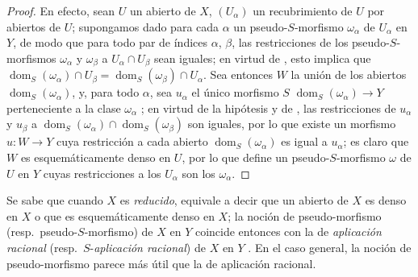 \begin{proof}
En efecto, sean $U$ un abierto de $X$, $(U_\alpha)$ un recubrimiento de $U$ por abiertos de $U$; supongamos dado para cada $\alpha$ un pseudo-$S$-morfismo $\omega_\alpha$ de $U_\alpha$ en $Y$, de modo que para todo par de índices $\alpha$, $\beta$, las restricciones  de los pseudo-$S$-morfismos $\omega_\alpha$ y $\omega_\beta$ a $U_\alpha\cap U_\beta$ sean iguales; en virtud de , esto implica que $\operatorname{dom}_S(\omega_\alpha)\cap U_\beta=\operatorname{dom}_S(\omega_\beta)\cap U_\alpha$.
Sea entonces $W$ la unión de los abiertos $\operatorname{dom}_S(\omega_\alpha)$, y, para todo $\alpha$, sea $u_\alpha$ el único morfismo $S$ $\operatorname{dom}_S(\omega_\alpha)\to Y$ perteneciente a la clase $\omega_\alpha$ ; en virtud de la hipótesis y de , las restricciones de $u_\alpha$ y $u_\beta$ a $\operatorname{dom}_S(\omega_\alpha)\cap\operatorname{dom}_S(\omega_\beta)$ son iguales, por lo que existe un morfismo $u:W\to Y$ cuya restricción a cada abierto $\operatorname{dom}_S(\omega_\alpha)$ es igual a $u_\alpha$; es claro que $W$ es esquemáticamente denso en $U$, por lo que define un pseudo-$S$-morfismo $\omega$ de $U$ en $Y$ cuyas restricciones a los $U_\alpha$ son los $\omega_\alpha$.
\end{proof}

\begin{remark}[20.2.7]
\label{IV.20.2.7}
Se sabe  que cuando $X$ es \emph{reducido}, equivale a decir que un abierto de $X$ es denso en $X$ o que es esquemáticamente denso en $X$; la noción de pseudo-morfismo (resp.\ pseudo-$S$-morfismo) de $X$ en $Y$ coincide entonces con la de \emph{aplicación racional} (resp.\ $S$-\emph{aplicación racional}) de $X$ en $Y$ .
En el caso general, la noción de pseudo-morfismo parece más útil que la de aplicación racional.
\end{remark}

